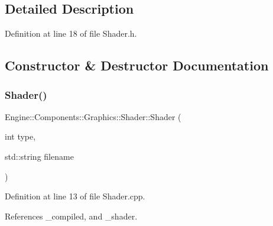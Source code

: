 \subsection{Detailed Description}


Definition at line 18 of file Shader.\+h.



\subsection{Constructor \& Destructor Documentation}
\mbox{\label{classEngine_1_1Components_1_1Graphics_1_1Shader_a4935f2ee3ebdd8af6fc78cf42f63d915}} 
\subsubsection{\texorpdfstring{Shader()}{Shader()}\hspace{0.1cm}{\footnotesize\ttfamily [1/2]}}
{\footnotesize\ttfamily Engine\+::\+Components\+::\+Graphics\+::\+Shader\+::\+Shader (\begin{DoxyParamCaption}\item[{int}]{type,  }\item[{std\+::string}]{filename }\end{DoxyParamCaption})}



Definition at line 13 of file Shader.\+cpp.



References \+\_\+compiled, and \+\_\+shader.


